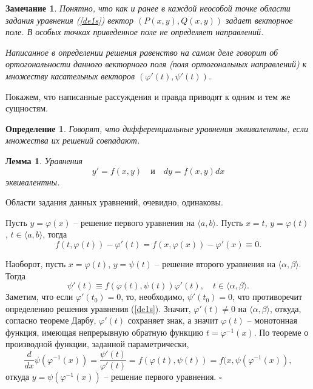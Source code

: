 \documentclass[a4paper,14pt]{extarticle}
\newtheorem{lemma}{Лемма}[subsection]
\newtheorem{definition}{Определение}[subsection]
\newtheorem{remark}{Замечание}[subsection]
\newenvironment{proof}%
{\begin{sloppypar}\noindent{\bf Доказательство.}}%
{\hspace*{\fill}$\square$\end{sloppypar}}
\begin{document}
\begin{remark}
Понятно, что как и ранее в каждой неособой точке области задания уравнения (\ref{de1s}) вектор $(P(x, y), Q(x,y))$ задает векторное поле. В особых точках приведенное поле не определяет направлений.

Написанное в определении решения равенство на самом деле говорит об ортогональности данного векторного поля (поля ортогональных направлений) к множеству касательных векторов $(\varphi'(t), \psi'(t))$.
\end{remark}
Покажем, что написанные рассуждения и правда приводят к одним и тем же сущностям.
\begin{definition}
Говорят, что дифференциальные уравнения эквивалентны, если множества их решений совпадают.	
\end{definition}
\begin{lemma}
Уравнения
$$
y' = f(x, y) \quad \text{и} \quad dy = f(x, y)dx
$$	
эквивалентны.
\end{lemma}
\begin{proof}
Области задания данных уравнений, очевидно, одинаковы.

Пусть $y = \varphi(x)$ -- решение первого уравнения на $\langle a, b \rangle$. Пусть $x = t$, $y = \varphi(t)$, $t \in \langle a, b \rangle$, тогда
$$
f(t, \varphi(t)) - \varphi'(t) = f(x, \varphi(x)) - \varphi'(x) \equiv 0.
$$

Наоборот, пусть $x = \varphi(t)$, $y = \psi(t)$ -- решение второго уравнения на $\langle \alpha, \beta \rangle$. Тогда
$$
\psi'(t) \equiv f(\varphi(t), \psi(t))\varphi'(t), \quad t \in \langle \alpha, \beta \rangle.
$$
Заметим, что если $\varphi'(t_0) = 0$, то, необходимо, $\psi'(t_0) = 0$, что противоречит определению решения уравнения (\ref{de1s}). Значит, $\varphi'(t) \neq 0$ на $\langle \alpha, \beta \rangle$, откуда, согласно теореме Дарбу, $\varphi'(t)$ сохраняет знак, а значит $\varphi(t)$ -- монотонная функция, имеющая непрерывную обратную функцию $t = \varphi^{-1}(x)$. По теореме о производной функции, заданной параметрически,
$$
\frac{d}{dx} \psi(\varphi^{-1}(x)) = \frac{\psi'(t)}{\varphi'(t)} = f(\varphi(t), \psi(t)) = f(x, \psi(\varphi^{-1}(x)),
$$
откуда $y = \psi(\varphi^{-1}(x))$ -- решение первого уравнения.
\end{proof}
\end{document}

